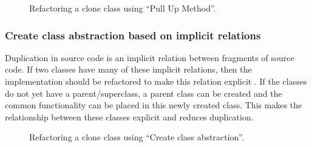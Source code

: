\begin{figure}[H]
\begin{parcolumns}{2}
\end{parcolumns}
\caption{Refactoring a clone class using ``Pull Up Method''.}
\label{fig:pullupmethod}
\end{figure}

\subsubsection{Create class abstraction based on implicit relations}
Duplication in source code is an implicit relation between fragments of source code. If two classes have many of these implicit relations, then the implementation should be refactored to make this relation explicit \cite{fowler2018refactoring}. If the classes do not yet have a parent/superclass, a parent class can be created and the common functionality can be placed in this newly created class. This makes the relationship between these classes explicit and reduces duplication.

\begin{figure}[H]
\begin{parcolumns}{2}
\end{parcolumns}
\caption{Refactoring a clone class using ``Create class abstraction''.}
\label{fig:createclassabstraction}
\end{figure}

